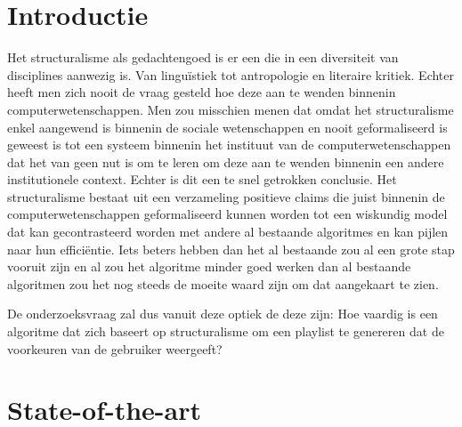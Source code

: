 
\section{Introductie} %
\label{sec:introductie}

Het structuralisme als gedachtengoed is er een die in een diversiteit van disciplines aanwezig is. Van linguïstiek tot antropologie en literaire kritiek. Echter heeft men zich nooit de vraag gesteld hoe deze aan te wenden binnenin computerwetenschappen. Men zou misschien menen dat omdat het structuralisme enkel aangewend is binnenin de sociale wetenschappen en nooit geformaliseerd is geweest is tot een systeem binnenin het instituut van de computerwetenschappen dat het van geen nut is om te leren om deze aan te wenden binnenin een andere institutionele context. Echter is dit een te snel getrokken conclusie. Het structuralisme bestaat uit een verzameling positieve claims die juist binnenin de computerwetenschappen geformaliseerd kunnen worden tot een wiskundig model dat kan gecontrasteerd worden met andere al bestaande algoritmes en kan pijlen naar hun efficiëntie. Iets beters hebben dan het al bestaande zou al een grote stap vooruit zijn en al zou het algoritme minder goed werken dan al bestaande algoritmen zou het nog steeds de moeite waard zijn om dat aangekaart te zien. 

De onderzoeksvraag zal dus vanuit deze optiek de deze zijn: Hoe vaardig is een algoritme dat zich baseert op structuralisme om een playlist te genereren dat de voorkeuren van de gebruiker weergeeft? 


\section{State-of-the-art}
\label{sec:state-of-the-art}

